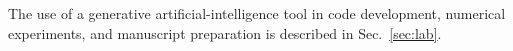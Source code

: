 The use of a generative artificial-intelligence tool in code development, numerical experiments, and manuscript preparation is described in Sec.~\ref{sec:lab}.
